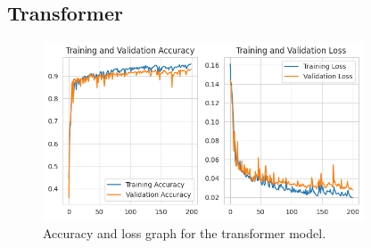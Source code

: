 \subsection{Transformer}\label{subsec:transformer}

\begin{figure}[ht]
    \centering
    \includegraphics[width=0.85\textwidth]{./img/transformer/accuracy-loss-graph}
    \caption{Accuracy and loss graph for the transformer model.}
    \label{fig:transformer-accuracy-loss-graph}
\end{figure}


